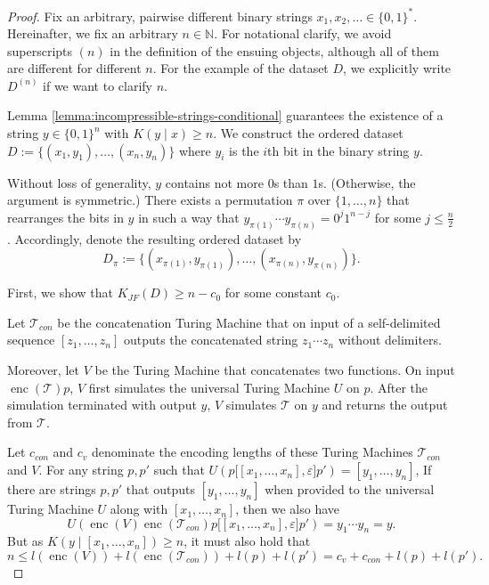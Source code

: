 \begin{proof}
	Fix an arbitrary, pairwise different binary strings $x_1,x_2,\dots\in\{0,1\}^{*}$.
	Hereinafter, we fix an arbitrary $n\in\mathbb{N}$.
	For notational clarify, we avoid superscripts $(n)$ in the definition of the ensuing objects, although all of them are different for different $n$. 
	For the example of the dataset $D$, we explicitly write $D^{(n)}$ if we want to clarify $n$.
	
	Lemma \ref{lemma:incompressible-strings-conditional} guarantees the existence of a string $y\in\{0,1\}^{n}$ with $K(y\mid x)\geq n$.
	We construct the ordered dataset $D:=\{(x_1,y_1),\dots,(x_n,y_n)\}$ where $y_i$ is the $i$th bit in the binary string $y$.
	
	Without loss of generality, $y$ contains not more $0$s than $1$s. (Otherwise, the argument is symmetric.)
	There exists a permutation $\pi$ over $\{1,\dots,n\}$ that rearranges the bits in $y$ in such a way that $y_{\pi(1)}\cdots y_{\pi(n)}=0^{j}1^{n-j}$ for some $j\leq \frac{n}{2}$.
	Accordingly, denote the resulting ordered dataset by
	\begin{equation}
		D_{\pi}:=\{(x_{\pi(1)},y_{\pi(1)}),\dots,(x_{\pi(n)},y_{\pi(n)})\}.
	\end{equation} 
	
	First, we show that $K_{JF}(D)\geq n-c_0$ for some constant $c_0$.
	
	Let $\mathcal{T}_{con}$ be the concatenation Turing Machine that on input of a self-delimited sequence $[z_1,\dots,z_n]$ outputs the concatenated string $z_1\cdots z_n$ without delimiters.
	
	Moreover, let $V$ be the Turing Machine that concatenates two functions.
	On input $\operatorname{enc}(\mathcal{T})p$, $V$ first simulates the universal Turing Machine $U$ on $p$. 
	After the simulation terminated with output $y$, $V$ simulates $\mathcal{T}$ on $y$ and returns the output from $\mathcal{T}$.
	
	Let $c_{con}$ and $c_v$ denominate the encoding lengths of these Turing Machines $\mathcal{T}_{con}$ and $V$.
	For any string $p,p'$ such that $U(p\bigl[[x_1,\dots,x_n],\varepsilon\bigr]p')=[y_1,\dots,y_n]$, 
	If there are strings $p,p'$ that outputs $[y_1,\dots,y_n]$ when provided to the universal Turing Machine $U$ along with $[x_1,\dots,x_n]$, then we also have
	\begin{equation}
		U(\operatorname{enc}(V)\operatorname{enc}(\mathcal{T}_{con})p\bigl[[x_1,\dots,x_n],\varepsilon\bigr]p')=y_1\cdots y_n=y.
	\end{equation}
	But as $K(y\mid [x_1,\dots,x_n])\geq n$, it must also hold that 
	\begin{equation}
	n\leq l(\operatorname{enc}(V))+l(\operatorname{enc}(\mathcal{T}_{con}))+l(p)+l(p')=c_v+c_{con}+l(p)+l(p').	
	\end{equation}
	

\end{proof}
